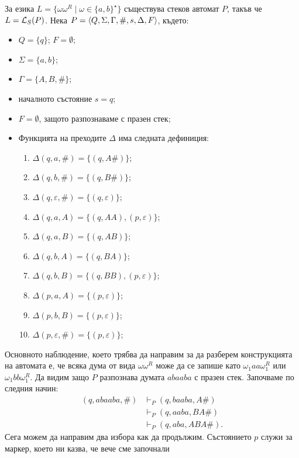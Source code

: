 \begin{example}
  \label{ex:omega-omega-r}
  За езика $L = \{\omega\omega^R \mid \omega \in \{a,b\}^\star\}$ съществува стеков автомат $P$, такъв че
  $L = \mathcal{L}_S(P)$.
  Нека $P = \langle{Q,\Sigma,\Gamma,\#,s,\Delta,F}\rangle$, където:
  \begin{itemize}
  \item 
    $Q = \{q\}$; $F = \emptyset$;
  \item
    $\Sigma = \{a,b\}$;
  \item
    $\Gamma = \{A, B, \#\}$;
  \item
    началното състояние $s = q$;
  \item
    $F = \emptyset$, защото разпознаваме с празен стек;
  \item
    Функцията на преходите $\Delta$ има следната дефиниция:
    \begin{enumerate}[(1)]
    \item 
      $\Delta(q, a, \#) = \{(q, A\#)\}$;
    \item 
      $\Delta(q, b, \#) = \{(q, B\#)\}$;
    \item
      $\Delta(q, \varepsilon, \#) = \{(q,\varepsilon)\}$;
    \item
      $\Delta(q, a, A) = \{(q, AA), (p, \varepsilon)\}$;
    \item
      $\Delta(q, a, B) = \{(q, AB)\}$;
    \item
      $\Delta(q, b, A) = \{(q, BA)\}$;
    \item
      $\Delta(q, b, B) = \{(q, BB), (p, \varepsilon)\}$;
    \item
      $\Delta(p, a, A) = \{(p,\varepsilon)\}$;
    \item
      $\Delta(p, b, B) = \{(p,\varepsilon)\}$;
    \item
      $\Delta(p, \varepsilon, \#) = \{(p,\varepsilon)\}$;
    \end{enumerate}
  \end{itemize}
  Основното наблюдение, което трябва да направим за да разберем конструкцията на автомата е, че
  всяка дума от вида $\omega\omega^R$ може да се запише като $\omega_1aa\omega^R_1$ или $\omega_1bb\omega^R_1$.
  Да видим защо $P$ разпознава думата $abaaba$ с празен стек.
  Започваме по следния начин:
  \begin{align*}
    (q,abaaba,\#) & \vdash_P (q,baaba,A\#)\\
    & \vdash_P (q, aaba, BA\#) \\
    & \vdash_P (q, aba, ABA\#).
  \end{align*}
  Сега можем да направим два избора как да продължим. Състоянието $p$ служи за маркер, което ни казва, че вече сме започнали 

\end{example}
